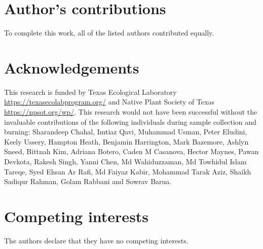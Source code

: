 \documentclass{bmcart}
\begin{document}

\begin{backmatter}



\section*{Author's contributions}

To complete this work, all of the listed authors contributed equally.

\section*{Acknowledgements}
This research is funded by Texas Ecological Laboratory  \url{https://texasecolabprogram.org/} and Native Plant Society of Texas \url{https://npsot.org/wp/}. This research would not have been successful without the invaluable contributions of the following individuals during sample collection and burning: Sharandeep Chahal, Imtiaz Qavi, Muhammad Usman, Peter Eludini, Keely Ussery, Hampton Heath, Benjamin Harrington, Mark Bazemore, Ashlyn Sneed, Bittnah Kim, Adriana Botero, Caden M Casanova, Hector Maynes, Pawan Devkota,  Rakesh Singh, Yanni Chen,  Md Wahiduzzaman, Md Towhidul Islam Tareqe, Syed Ehsan Ar Rafi, Md Faiyaz Kabir, Mohammad Tarak Aziz, Shaikh Sadiqur Rahman, Golam Rabbani and Sowrav Barua.

\section*{Competing interests}
  The authors declare that they have no competing interests.



\end{backmatter}
\end{document}
